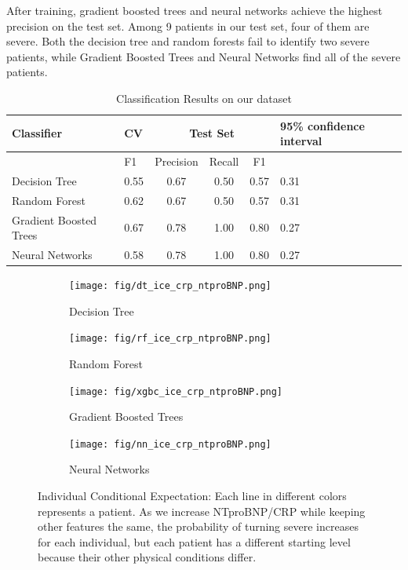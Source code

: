 After training, gradient boosted trees and neural networks achieve the highest precision on the test set. Among 9 patients in our test set, four of them are severe. Both the decision tree and random forests fail to identify two severe patients, while Gradient Boosted Trees and Neural Networks find all of the severe patients. 

\begin{table}[H]
\centering
\caption{Classification Results on our dataset}
\begin{tabular}{p{2cm}p{1.1cm}cccp{1cm}}
\toprule
Classifier    & CV & \multicolumn{3}{c}{Test Set} & 95\% confidence interval \\ \midrule
                        & F1     & Precision  & Recall  & F1    &\\
Decision Tree           & 0.55   & 0.67       & 0.50    & 0.57  & 0.31\\
Random Forest           & 0.62   & 0.67       & 0.50    & 0.57  & 0.31\\
Gradient Boosted Trees  & 0.67   & 0.78       & 1.00    & 0.80  & 0.27\\
Neural Networks         & 0.58   & 0.78       & 1.00    & 0.80  & 0.27\\ \bottomrule
\end{tabular}
\end{table}


\begin{figure}
\centering
\begin{subfigure}[b]{0.485\textwidth}
    \centering
    \texttt{[image: fig/dt\_ice\_crp\_ntproBNP.png]}
    \caption{Decision Tree}
    \label{fig:dt_ice}
\end{subfigure}
\hfill
\begin{subfigure}[b]{0.485\textwidth}
    \centering
    \texttt{[image: fig/rf\_ice\_crp\_ntproBNP.png]}
    \caption{Random Forest}
    \label{fig:rf_ice}
\end{subfigure}
\hfill
\begin{subfigure}[b]{0.485\textwidth}
    \centering
    \texttt{[image: fig/xgbc\_ice\_crp\_ntproBNP.png]}
    \caption{Gradient Boosted Trees}
    \label{fig:gbt_ice}
\end{subfigure}
\hfill
\begin{subfigure}[b]{0.485\textwidth}
    \centering
    \texttt{[image: fig/nn\_ice\_crp\_ntproBNP.png]}
    \caption{Neural Networks}
    \label{fig:nn_ice}
\end{subfigure}
\caption{Individual Conditional Expectation: Each line in different colors represents a patient. As we increase NTproBNP/CRP while keeping other features the same, the probability of turning severe increases for each individual, but each patient has a different starting level because their other physical conditions differ.}
\label{fig.ice}
\end{figure}


